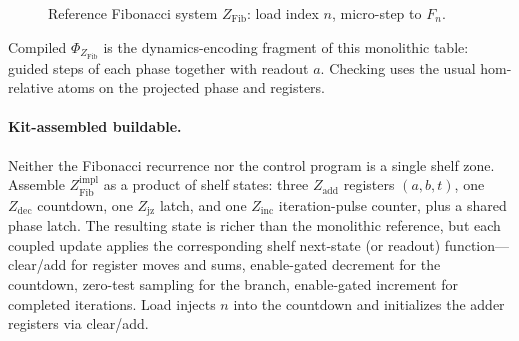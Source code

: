 \begin{figure}[!ht]
  \centering
  \caption{Reference Fibonacci system $Z_{\mathrm{Fib}}$: load index $n$, micro-step to $F_n$.}
  \label{fig:fib-spec}
\end{figure}

Compiled $\Phi_{Z_{\mathrm{Fib}}}$ is the dynamics-encoding fragment of this monolithic table: guided steps of each phase together with readout $a$. Checking uses the usual hom-relative atoms on the projected phase and registers.

\paragraph{Kit-assembled buildable.}
Neither the Fibonacci recurrence nor the control program is a single shelf zone. Assemble $Z_{\mathrm{Fib}}^{\mathrm{impl}}$ as a product of shelf states: three $Z_{\mathrm{add}}$ registers $(a,b,t)$, one $Z_{\mathrm{dec}}$ countdown, one $Z_{\mathrm{jz}}$ latch, and one $Z_{\mathrm{inc}}$ iteration-pulse counter, plus a shared phase latch. The resulting state is richer than the monolithic reference, but each coupled update applies the corresponding shelf next-state (or readout) function---clear/add for register moves and sums, enable-gated decrement for the countdown, zero-test sampling for the branch, enable-gated increment for completed iterations. Load injects $n$ into the countdown and initializes the adder registers via clear/add.

